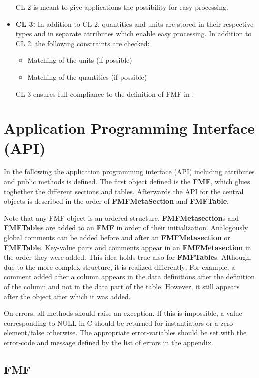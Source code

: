 \documentclass[10pt,utf8, mainlanguage=english]{ufcd-info}
\newcommand{\fmfobj}[1]{{\textbf{\textsf{#1}}}}
\begin{document}
\begin{itemize}
\begin{itemize}
	\end{itemize}
	CL 2 is meant to give applications the possibility for easy processing.
	\item {\bf CL 3:} In addition to CL 2, quantities and units are stored in their respective types and in separate attributes which enable easy processing. In addition to CL 2, the following constraints are checked:
	 \begin{itemize}
		\item Matching of the units (if possible)
		\item Matching of the quantities (if possible)
	\end{itemize}
	CL 3 ensures full compliance to the definition of FMF in \cite{RiedeCPC181_2010}.
\end{itemize}

\section{Application Programming Interface (API)}\label{sec:API}
In the following the application programming interface (API) including attributes and public methods is defined. The first object defined is the \fmfobj{FMF}, which glues toghether the different sections and tables. Afterwards the API for the central objects is described in the order of \fmfobj{FMFMetaSection} and \fmfobj{FMFTable}.

Note that any FMF object is an ordered structure. \fmfobj{FMFMetasection}s and \fmfobj{FMFTable}s are added to an \fmfobj{FMF} in order of their initialization. Analogously global comments can be added before and after an \fmfobj{FMFMetasection} or \fmfobj{FMFTable}. Key-value pairs and comments appear in an \fmfobj{FMFMetasection} in the order they were added. This idea holds true also for \fmfobj{FMFTable}s. Although, due to the more complex structure, it is realized differently: For example, a comment added after a column appears in the data definitions after the definition of the column and not in the data part of the table. However, it still appears after the object after which it was added.

On errors, all methods should raise an exception. If this is impossible, a value corresponding to NULL in C should be returned for instantiators or a zero-element/false otherwise. The appropriate error-variables should be set with the error-code and message defined by the list of errors in the appendix.

\subsection{FMF}\label{subsec:FMF}
\end{document}
